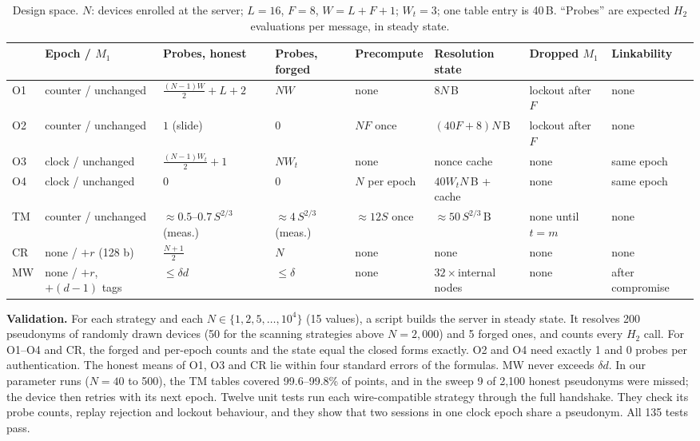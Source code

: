 \begin{table}[t]
\centering
\caption{Design space. $N$: devices enrolled at the server; $L=16$, $F=8$, $W=L+F+1$; $W_t=3$; one table entry is 40\,B.
``Probes'' are expected $H_2$ evaluations per message, in steady state.}
\label{tab:design}
\footnotesize
\setlength{\tabcolsep}{3.2pt}
\begin{tabular}{@{}l l l l l l l l@{}}
\toprule
 & Epoch / $M_1$ & Probes, honest & Probes, forged & Precompute & Resolution state & Dropped $M_1$ & Linkability \\
\midrule
O1 & counter / unchanged & $\frac{(N-1)W}{2}+L+2$ & $NW$ & none & $8N$\,B & lockout after $F$ & none \\
O2 & counter / unchanged & $1$ (slide) & $0$ & $NF$ once & $(40F+8)N$\,B & lockout after $F$ & none \\
O3 & clock / unchanged & $\frac{(N-1)W_t}{2}+1$ & $NW_t$ & none & nonce cache & none & same epoch \\
O4 & clock / unchanged & $0$ & $0$ & $N$ per epoch & $40W_tN$\,B + cache & none & same epoch \\
TM & counter / unchanged & $\approx0.5$--$0.7\,S^{2/3}$ (meas.) & $\approx4\,S^{2/3}$ (meas.) & $\approx12S$ once & $\approx50\,S^{2/3}$\,B & none until $t=m$ & none \\
CR & none / $+r$ (128 b) & $\frac{N+1}{2}$ & $N$ & none & none & none & none \\
MW & none / $+r$, $+(d-1)$ tags & $\le\delta d$ & $\le\delta$ & none & $32\times$internal nodes & none & after compromise \\
\bottomrule
\end{tabular}
\end{table}

\textbf{Validation.} For each strategy and each $N\in\{1,2,5,\dots,10^4\}$ (15 values), a script builds the server in
steady state. It resolves 200 pseudonyms of randomly drawn devices (50 for the scanning strategies above $N=2{,}000$) and 5 forged
ones, and counts
every $H_2$ call. For O1--O4 and CR, the forged and per-epoch counts and the state equal the closed forms exactly. O2
and O4 need exactly 1 and 0 probes per authentication. The honest means of O1, O3 and CR lie within four standard
errors of the formulas. MW never exceeds $\delta d$. In our parameter runs ($N=40$ to 500), the TM tables covered 99.6--99.8\% of
points, and in the sweep 9 of 2{,}100 honest pseudonyms were missed; the device then retries with its next epoch. Twelve unit tests run each wire-compatible
strategy through the full handshake. They check its probe counts, replay rejection and lockout behaviour, and they show
that two sessions in one clock epoch share a pseudonym. All 135 tests pass.

